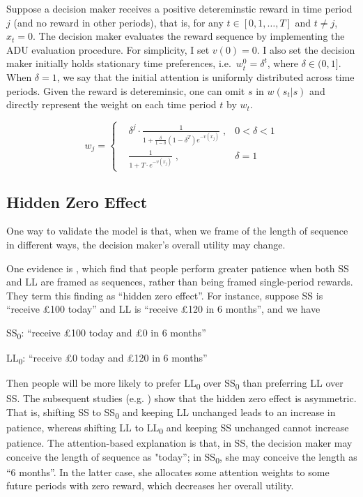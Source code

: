 \documentclass[
  12pt,
]{article}
\begin{document}
Suppose a decision maker receives a positive detereminstic reward in
time period \(j\) (and no reward in other periods), that is, for any
\(t\in[0,1,…,T]\) and \(t \neq j\), \(x_t = 0\). The decision maker
evaluates the reward sequence by implementing the ADU evaluation
procedure. For simplicity, I set \(v(0)=0\). I also set the decision
maker initially holds stationary time preferences,
i.e.~\(w^0_t=\delta^t\), where \(\delta\in(0,1]\). When \(\delta=1\), we
say that the initial attention is uniformly distributed across time
periods. Given the reward is detereminsic, one can omit \(s\) in
\(w(s_t|s)\) and directly represent the weight on each time period \(t\)
by \(w_t\).

\[ 
w_j = \left\{ \begin{aligned}
& \delta^j \cdot\frac{1}{1+\frac{\delta}{1-\delta}(1-\delta^T)e^{-v(x_j)}}\;, & 0<\delta<1 \\
& \frac{1}{1+T\cdot e^{-v(x_j)}}\; , & \delta=1
\end{aligned}
\right.
\]

\hypertarget{hidden-zero-effect}{%
\subsection{Hidden Zero Effect}\label{hidden-zero-effect}}

One way to validate the model is that, when we frame of the length of
sequence in different ways, the decision maker's overall utility may
change.

One evidence is \citet{magen_hidden-zero_2008}, which find that people
perform greater patience when both SS and LL are framed as sequences,
rather than being framed single-period rewards. They term this finding
as ``hidden zero effect''. For instance, suppose SS is ``receive £100
today'' and LL is ``receive £120 in 6 months'', and we have

SS\textsubscript{0}: ``receive £100 today and £0 in 6 months''

LL\textsubscript{0}: ``receive £0 today and £120 in 6 months''

Then people will be more likely to prefer LL\textsubscript{0} over
SS\textsubscript{0} than preferring LL over SS. The subsequent studies
(e.g. \citet{read_value_2017}) show that the hidden zero effect is
asymmetric. That is, shifting SS to SS\textsubscript{0} and keeping LL
unchanged leads to an increase in patience, whereas shifting LL to
LL\textsubscript{0} and keeping SS unchanged cannot increase patience.
The attention-based explanation is that, in SS, the decision maker may
conceive the length of sequence as "today''; in SS\textsubscript{0}, she
may conceive the length as ``6 months''. In the latter case, she
allocates some attention weights to some future periods with zero
reward, which decreases her overall utility.
\end{document}
